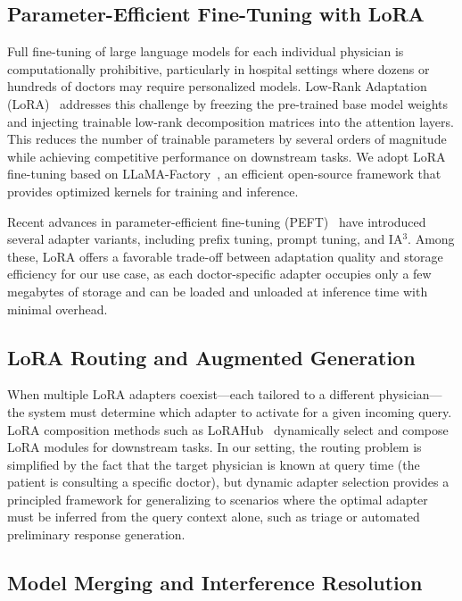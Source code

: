 \subsection{Parameter-Efficient Fine-Tuning with LoRA}

Full fine-tuning of large language models for each individual physician is computationally prohibitive, particularly in hospital settings where dozens or hundreds of doctors may require personalized models. Low-Rank Adaptation (LoRA)~\cite{hu2021lora} addresses this challenge by freezing the pre-trained base model weights and injecting trainable low-rank decomposition matrices into the attention layers. This reduces the number of trainable parameters by several orders of magnitude while achieving competitive performance on downstream tasks. We adopt LoRA fine-tuning based on LLaMA-Factory~\cite{zheng2024llamafactory}, an efficient open-source framework that provides optimized kernels for training and inference.

Recent advances in parameter-efficient fine-tuning (PEFT)~\cite{peft} have introduced several adapter variants, including prefix tuning, prompt tuning, and IA$^3$. Among these, LoRA offers a favorable trade-off between adaptation quality and storage efficiency for our use case, as each doctor-specific adapter occupies only a few megabytes of storage and can be loaded and unloaded at inference time with minimal overhead.

\subsection{LoRA Routing and Augmented Generation}

When multiple LoRA adapters coexist---each tailored to a different physician---the system must determine which adapter to activate for a given incoming query. LoRA composition methods such as LoRAHub~\cite{huangLoraHubEfficientCrossTask2024} dynamically select and compose LoRA modules for downstream tasks. In our setting, the routing problem is simplified by the fact that the target physician is known at query time (the patient is consulting a specific doctor), but dynamic adapter selection provides a principled framework for generalizing to scenarios where the optimal adapter must be inferred from the query context alone, such as triage or automated preliminary response generation.

\subsection{Model Merging and Interference Resolution}

